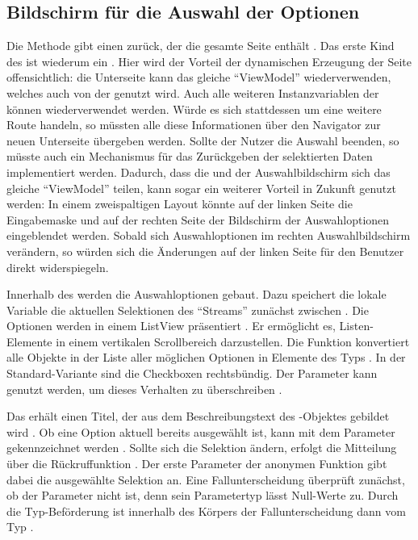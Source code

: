 \subsection{Bildschirm für die Auswahl der Optionen}

 
Die Methode  \Lst{\ref{lst:Schritt1FunktionCreateMultipleChoiceSelectionScreen}} gibt einen  zurück, der die gesamte Seite enthält .
Das erste Kind des  ist wiederum ein  .
Hier wird der Vorteil der dynamischen Erzeugung der Seite offensichtlich: die Unterseite kann das gleiche \enquote{ViewModel} wiederverwenden, welches auch von der  genutzt wird.
Auch alle weiteren Instanzvariablen der  können wiederverwendet werden.
Würde es sich stattdessen um eine weitere Route handeln, so müssten alle diese Informationen über den Navigator zur neuen Unterseite übergeben werden.
Sollte der Nutzer die Auswahl beenden, so müsste auch ein Mechanismus für das Zurückgeben der selektierten Daten implementiert werden.
Dadurch, dass die  und der Auswahlbildschirm sich das gleiche \enquote{ViewModel} teilen,
kann sogar ein weiterer Vorteil in Zukunft genutzt werden:
In einem zweispaltigen Layout könnte auf der linken Seite die Eingabemaske und auf der rechten Seite der Bildschirm der Auswahloptionen eingeblendet werden.
Sobald sich Auswahloptionen im rechten Auswahlbildschirm verändern, so würden sich die Änderungen auf der linken Seite für den Benutzer direkt widerspiegeln.

Innerhalb des  werden die Auswahloptionen gebaut.
Dazu speichert die lokale Variable  die aktuellen Selektionen des \enquote{Streams} zunächst zwischen .
Die Optionen werden in einem ListView präsentiert .
Er ermöglicht es, Listen-Elemente in einem vertikalen Scrollbereich darzustellen.
Die Funktion  konvertiert alle Objekte in der Liste aller möglichen Optionen  in Elemente des Typs  .
In der Standard-Variante sind die Checkboxen rechtsbündig.
Der Parameter  kann genutzt werden, um dieses Verhalten zu überschreiben .

Das  erhält einen Titel, der aus dem Beschreibungstext  des -Objektes gebildet wird .
Ob eine Option aktuell bereits ausgewählt ist, kann mit dem Parameter  gekennzeichnet werden .
Sollte sich die Selektion ändern, erfolgt die Mitteilung über die Rückruffunktion  .
Der erste Parameter der anonymen Funktion gibt dabei die ausgewählte Selektion an.
Eine Fallunterscheidung überprüft zunächst, ob der Parameter  nicht  ist, denn sein Parametertyp  lässt Null-Werte zu.
Durch die Typ-Beförderung ist  innerhalb des Körpers der Fallunterscheidung dann vom Typ  . 


